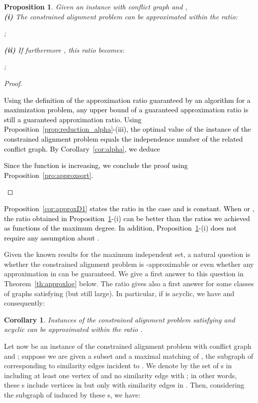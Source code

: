 \documentclass[final]{dmtcs-episciences}
\newtheorem{corollary}[theorem]{Corollary}
\newtheorem{proposition}[theorem]{Proposition}
\newcommand\mar[1]{\textcolor{black}{#1}}
\begin{document}
\begin{proposition}\label{cor:approxalpha2}
Given an instance  with conflict graph  and ,\\
{\bf{(i)}} The constrained alignment problem can be approximated within the ratio:\\
{\centerline{;}}
{\bf{(ii)}} If furthermore , this ratio becomes:\\{\centerline{;}}
\end{proposition}
\begin{proof}
\mar{Using the definition of the approximation ratio guaranteed by an algorithm for a maximization problem, any upper bound of a guaranteed approximation ratio is still a guaranteed approximation ratio. Using Proposition~\ref{prop:reduction_alpha}-(iii), the optimal value  of the instance  of the constrained alignment problem  equals the independence number  of the related conflict graph. By Corollary~\ref{cor:alpha}, we deduce  
 
Since the function  is increasing, we conclude the proof using Proposition~\ref{pro:approxsqrt}.}
\end{proof}

\mar{Proposition~\ref{cor:approxD1} states the ratio  in the case  and  is constant.
When  or , the ratio obtained in Proposition~\ref{cor:approxalpha2}-(i) can be better than the ratios we achieved  as functions of the maximum degree. In addition, Proposition~\ref{cor:approxalpha2}-(i) does not require any assumption about . }

Given the known results for the maximum independent set, a natural question is whether the constrained alignment problem is -approximable or even whether any approximation in  can be guaranteed. We give a first answer to this question in Theorem~\ref{th:approxlog} below.
The ratio  gives also a first answer for some classes of graphs satisfying  (but  still large). In particular, if  is acyclic, we have  and consequently:

\begin{corollary}\label{cor: approxacyclic}
Instances of the constrained alignment problem satisfying  and  acyclic can be approximated within the ratio .
\end{corollary}



Let now  be an instance of the constrained alignment problem with conflict graph  and ; suppose we are given a subset  and a maximal matching  of , the subgraph of  corresponding to similarity edges incident to . We denote by  the set of s in   including at least one vertex of  and no similarity edge  with ; in other words, these s include vertices in  but only with similarity edges in . Then, considering the subgraph  of  induced by these s, we have: 
\end{document}
